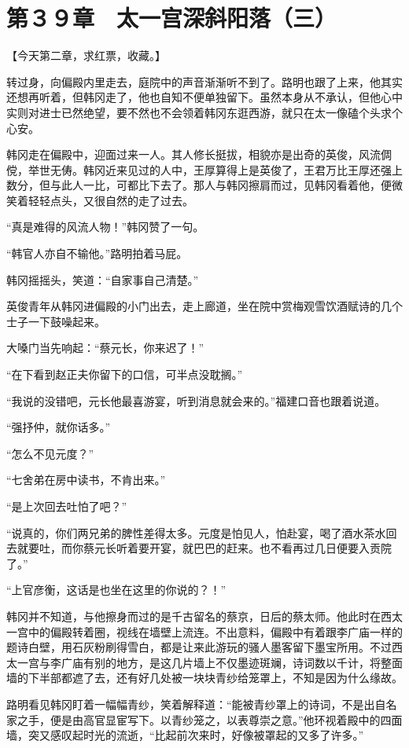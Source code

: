 \section{第３９章　太一宫深斜阳落（三）}

【今天第二章，求红票，收藏。】

转过身，向偏殿内里走去，庭院中的声音渐渐听不到了。路明也跟了上来，他其实还想再听着，但韩冈走了，他也自知不便单独留下。虽然本身从不承认，但他心中实则对进士已然绝望，要不然也不会领着韩冈东逛西游，就只在太一像磕个头求个心安。

韩冈走在偏殿中，迎面过来一人。其人修长挺拔，相貌亦是出奇的英俊，风流倜傥，举世无俦。韩冈近来见过的人中，王厚算得上是英俊了，王君万比王厚还强上数分，但与此人一比，可都比下去了。那人与韩冈擦肩而过，见韩冈看着他，便微笑着轻轻点头，又很自然的走了过去。

“真是难得的风流人物！”韩冈赞了一句。

“韩官人亦自不输他。”路明拍着马屁。

韩冈摇摇头，笑道：“自家事自己清楚。”

英俊青年从韩冈进偏殿的小门出去，走上廊道，坐在院中赏梅观雪饮酒赋诗的几个士子一下鼓噪起来。

大嗓门当先响起：“蔡元长，你来迟了！”

“在下看到赵正夫你留下的口信，可半点没耽搁。”

“我说的没错吧，元长他最喜游宴，听到消息就会来的。”福建口音也跟着说道。

“强抒仲，就你话多。”

“怎么不见元度？”

“七舍弟在房中读书，不肯出来。”

“是上次回去吐怕了吧？”

“说真的，你们两兄弟的脾性差得太多。元度是怕见人，怕赴宴，喝了酒水茶水回去就要吐，而你蔡元长听着要开宴，就巴巴的赶来。也不看再过几日便要入贡院了。”

“上官彦衡，这话是也坐在这里的你说的？！”

韩冈并不知道，与他擦身而过的是千古留名的蔡京，日后的蔡太师。他此时在西太一宫中的偏殿转着圈，视线在墙壁上流连。不出意料，偏殿中有着跟李广庙一样的题诗白壁，用石灰粉刷得雪白，都是让来此游玩的骚人墨客留下墨宝所用。不过西太一宫与李广庙有别的地方，是这几片墙上不仅墨迹斑斓，诗词数以千计，将整面墙的下半部都遮了去，还有好几处被一块块青纱给笼罩上，不知是因为什么缘故。

路明看见韩冈盯着一幅幅青纱，笑着解释道：“能被青纱罩上的诗词，不是出自名家之手，便是由高官显宦写下。以青纱笼之，以表尊崇之意。”他环视着殿中的四面墙，突又感叹起时光的流逝，“比起前次来时，好像被罩起的又多了许多。”

